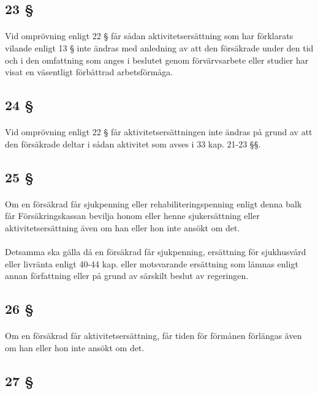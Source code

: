 \documentclass[a4paper,notitlepage,openany,10pt]{book}
\begin{document}
\subsection*{23 §}
\paragraph*{}
Vid omprövning enligt 22 § får sådan aktivitetsersättning som har förklarats vilande enligt 13 § inte ändras med anledning av att den försäkrade under den tid och i den omfattning som anges i beslutet genom förvärvsarbete eller studier har visat en väsentligt förbättrad arbetsförmåga.
\subsection*{24 §}
\paragraph*{}
Vid omprövning enligt 22 § får aktivitetsersättningen inte ändras på grund av att den försäkrade deltar i sådan aktivitet som avses i 33 kap. 21-23 §§.
\subsection*{25 §}
\paragraph*{}
Om en försäkrad får sjukpenning eller rehabiliteringspenning enligt denna balk får Försäkringskassan bevilja honom eller henne sjukersättning eller aktivitetsersättning även om han eller hon inte ansökt om det.
\paragraph*{}
Detsamma ska gälla då en försäkrad får sjukpenning, ersättning för sjukhusvård eller livränta enligt 40-44 kap.
eller motsvarande ersättning som lämnas enligt annan författning eller på grund av särskilt beslut av regeringen.
\subsection*{26 §}
\paragraph*{}
Om en försäkrad får aktivitetsersättning, får tiden för förmånen förlängas även om han eller hon inte ansökt om det.
\subsection*{27 §}
\end{document}
